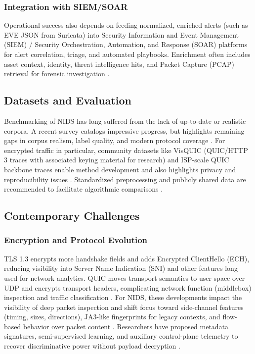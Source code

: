 \subsubsection{Integration with SIEM/SOAR} 
Operational success also depends on feeding normalized, enriched alerts (such as EVE JSON from Suricata) into Security Information and Event Management (SIEM) / Security Orchestration, Automation, and Response (SOAR) platforms for alert correlation, triage, and automated playbooks. Enrichment often includes asset context, identity, threat intelligence hits, and Packet Capture (PCAP) retrieval for forensic investigation \parencite{SuricataDocs2025,Diana2025Overview}.

\subsection{Datasets and Evaluation} 
Benchmarking of NIDS has long suffered from the lack of up-to-date or realistic corpora. A recent survey catalogs impressive progress, but highlights remaining gaps in corpus realism, label quality, and modern protocol coverage \parencite{KBS2025Datasets,AppliedIntelligence2025Benchmark}. For encrypted traffic in particular, community datasets like VisQUIC (QUIC/HTTP 3 traces with associated keying material for research) and ISP-scale QUIC backbone traces enable method development and also highlights privacy and reproducibility issues \parencite{VisQUIC2024,QUICBackbone2023}. Standardized preprocessing and publicly shared data are recommended to facilitate algorithmic comparisons \parencite{AppliedIntelligence2025Benchmark}.

\subsection{Contemporary Challenges} 
\subsubsection{Encryption and Protocol Evolution} 
TLS 1.3 encrypts more handshake fields and adds Encrypted ClientHello (ECH), reducing visibility into Server Name Indication (SNI) and other features long used for network analytics. QUIC moves transport semantics to user space over UDP and encrypts transport headers, complicating network function (middlebox) inspection and traffic classification \parencite{Zhou2024TLS13Survey}. For NIDS, these developments impact the visibility of deep packet inspection and shift focus toward side-channel features (timing, sizes, directions), JA3-like fingerprints for legacy contexts, and flow-based behavior over packet content \parencite{Zhou2024TLS13Survey,VisQUIC2024}. Researchers have proposed metadata signatures, semi-supervised learning, and auxiliary control-plane telemetry to recover discriminative power without payload decryption \parencite{EncryptedNIDS2022,VisQUIC2024,QUICBackbone2023}.


